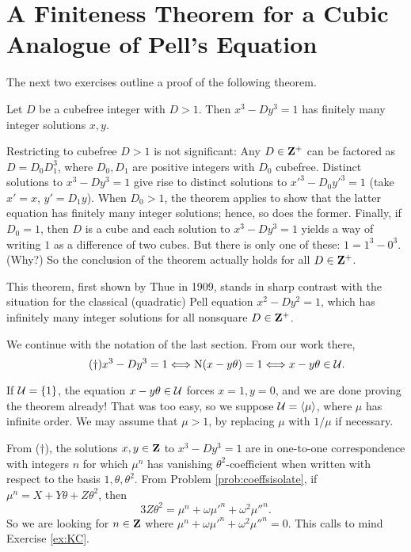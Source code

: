 \section*{A Finiteness Theorem for a Cubic Analogue of Pell's Equation} 
The next two exercises outline a proof of the following theorem.

\begin{thm} Let $D$ be a cubefree integer with $D>1$. Then $x^3-Dy^3=1$ has finitely many integer solutions $x,y$.
\end{thm}

Restricting to cubefree $D> 1$ is not significant: Any $D \in \mathbf{Z}^{+}$ can be factored as $D = D_0 D_1^3$, where $D_0, D_1$ are positive integers with $D_0$ cubefree. Distinct solutions to $x^3-D y^3=1$ give rise to distinct solutions to $x'^3 - D_0 y'^3=1$ (take $x'=x$, $y'=D_1 y$). When $D_0 > 1$, the theorem applies to show that the latter equation has finitely many integer solutions; hence, so does the former. Finally, if $D_0=1$, then $D$ is a cube and each solution to $x^3-Dy^3=1$ yields a way of writing $1$ as a difference of two cubes. But there is only one of these: $1 = 1^3-0^3$. (Why?) So the conclusion of the theorem actually holds for all $D \in \mathbf{Z}^{+}$.

This theorem, first shown by Thue in 1909, stands in sharp contrast with the situation for the classical (quadratic) Pell equation $x^2-Dy^2=1$, which has infinitely many integer solutions for all nonsquare $D\in \mathbf{Z}^{+}$.

We continue with the notation of the last section.  From our work there, \begin{equation}\tag{$\dagger$} x^3-Dy^3=1  \Longleftrightarrow \mathrm{N}(x-y\theta)=1\Longleftrightarrow x-y\theta \in \mathcal{U}.\end{equation}

If $\mathcal{U}=\{1\}$, the equation $x-y\theta\in \mathcal{U}$ forces $x=1, y=0$, and we are done proving the theorem already! That was too easy, so we suppose $\mathcal{U} = \langle \mu\rangle$, where $\mu$ has infinite order. We may assume that $\mu  > 1$, by replacing $\mu$ with $1/\mu$ if necessary. 

From ($\dagger$), the solutions $x,y \in \mathbf{Z}$ to $x^3-Dy^3= 1$ are in one-to-one correspondence with integers $n$ for which $\mu^n$ has vanishing $\theta^2$-coefficient when written with respect to the basis $1,\theta,\theta^2$. From Problem \ref{prob:coeffsisolate}, if $\mu^n = X + Y\theta + Z\theta^2$, then 
\[ 3Z \theta^2 = \mu^n + \omega \mu'^n + \omega^2 \mu''^n. \]
So we are looking for $n\in \mathbf{Z}$ where $\mu^n + \omega \mu'^n + \omega^2 \mu''^n=0$. This calls to mind Exercise \ref{ex:KC}.


